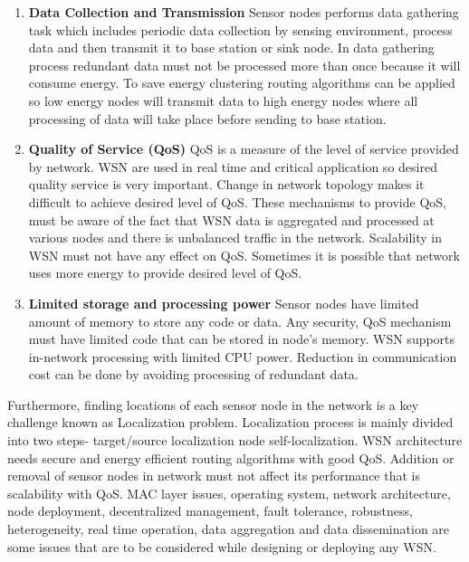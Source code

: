 \begin{enumerate}[label=\textbf{\roman*.}]
    \item \textbf{Data Collection and Transmission }
    Sensor nodes performs data gathering task which includes periodic data collection by sensing environment, process data and then transmit it to base station or sink node. In data gathering process redundant data must not be processed more than once because it will consume energy. To save energy clustering routing algorithms can be applied so low energy nodes will transmit data to high energy nodes where all processing of data will take place before sending to base station.
    \item \textbf{Quality of Service (QoS) }
    QoS is a measure of the level of service provided by network. WSN are used in real time and critical application so desired quality service is very important. Change in network topology makes it difficult to achieve desired level of QoS. These mechanisms to provide QoS, must be aware of the fact that WSN data is aggregated and processed at various nodes and there is unbalanced traffic in the network. Scalability in WSN must not have any effect on QoS. Sometimes it is possible that network uses more energy to provide desired level of QoS.
    \item \textbf{Limited storage and processing power }
    Sensor nodes have limited amount of memory to store any code or data. Any security, QoS mechanism must have limited code that can be stored in node’s memory. WSN supports in-network processing with limited CPU power. Reduction in communication cost can be done by avoiding processing of redundant data.
\end{enumerate}
Furthermore, finding locations of each sensor node in the network is a key challenge known as Localization problem. Localization process is mainly divided into two steps- target/source localization node self-localization. WSN architecture needs secure and energy efficient routing algorithms with good QoS. Addition or removal of sensor nodes in network must not affect its performance that is scalability with QoS. MAC layer issues, operating system, network  architecture, node deployment, decentralized management, fault tolerance, robustness, heterogeneity, real time operation, data aggregation and data dissemination are some issues that are to be considered while designing or deploying any WSN.

